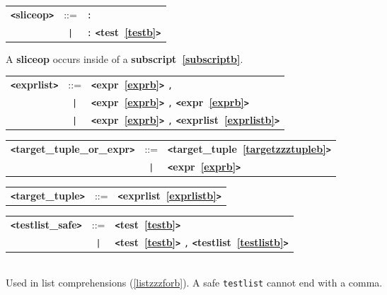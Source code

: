 \documentclass[12pt]{article}
\begin{document}
\label{sliceopb}
\begin{tabular}{lcl}
{\bf \verb+<+sliceop\verb+>+} & ::=  & \verb|:| \\
 & \verb+|+  & \verb|:| {\bf \verb+<+test~\ref{testb}\verb+>+}  \\
\end{tabular}

A {\bf sliceop} occurs inside of a {\bf subscript~\ref{subscriptb}}.

\label{exprlistb}
\begin{tabular}{lcl}
{\bf \verb+<+exprlist\verb+>+} & ::=  & {\bf \verb+<+expr~\ref{exprb}\verb+>+}  \verb|,| \\
 & \verb+|+  & {\bf \verb+<+expr~\ref{exprb}\verb+>+}  \verb|,| {\bf \verb+<+expr~\ref{exprb}\verb+>+}  \\
 & \verb+|+  & {\bf \verb+<+expr~\ref{exprb}\verb+>+}  \verb|,| {\bf \verb+<+exprlist~\ref{exprlistb}\verb+>+}  \\
\end{tabular}

\label{targetzzztuplezzzorzzzexprb}
\begin{tabular}{lcl}
{\bf \verb+<+target\_tuple\_or\_expr\verb+>+} & ::=  & {\bf \verb+<+target\_tuple~\ref{targetzzztupleb}\verb+>+}  \\
 & \verb+|+  & {\bf \verb+<+expr~\ref{exprb}\verb+>+}  \\
\end{tabular}

\label{targetzzztupleb}
\begin{tabular}{lcl}
{\bf \verb+<+target\_tuple\verb+>+} & ::=  & {\bf \verb+<+exprlist~\ref{exprlistb}\verb+>+}  \\
\end{tabular}

\label{testlistzzzsafeb}
\begin{tabular}{lcl}
{\bf \verb+<+testlist\_safe\verb+>+} & ::=  & {\bf \verb+<+test~\ref{testb}\verb+>+}  \\
 & \verb+|+  & {\bf \verb+<+test~\ref{testb}\verb+>+}  \verb|,| {\bf \verb+<+testlist~\ref{testlistb}\verb+>+}  \\
\end{tabular} \\

Used in list comprehensions (\ref{listzzzforb}).  A safe \verb|testlist| cannot end with a comma.
\end{document}
